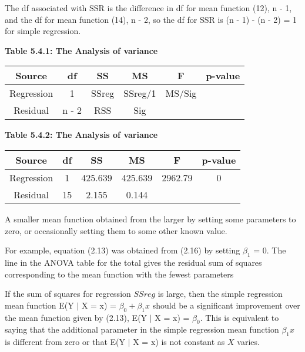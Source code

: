 \documentclass{article}
\begin{document}
    The df associated with SSR is the difference in df for mean function (12), n - 1, and the df for mean function (14), n - 2, so the df for SSR is (n - 1) - (n - 2) = 1 for simple regression. 
    
   
    \begin{center}
        \textbf{Table 5.4.1: The Analysis of variance}

        \begin{tabular}{|c|c|c|c|c|c|}
            \hline 
            Source & df & SS & MS & F & p-value \\
            \hline
            Regression & 1 & SSreg & SSreg/1 & MS/Sig & \\
            \hline
            Residual & n - 2 & RSS & Sig & & \\
            \hline
        \end{tabular}
    \end{center}
    
    \begin{center}
        \textbf{Table 5.4.2: The Analysis of variance}

        \begin{tabular}{|c|c|c|c|c|c|}
            \hline 
            Source & df & SS & MS & F & p-value \\
            \hline
            Regression & 1 & 425.639 & 425.639  & 2962.79 & 0 \\
            \hline
            Residual & 15 & 2.155 & 0.144 & & \\
            \hline
        \end{tabular}
    \end{center}
    
    A smaller mean function obtained from the larger by setting some parameters to zero, or occasionally setting them to some other known value. 
    
    For example, equation (2.13) was obtained from (2.16) by setting $\beta_{1}$ = 0. The line in the ANOVA table for the total gives the residual sum of squares corresponding to the mean function with the fewest parameters
    

    If the sum of squares for regression $SSreg$ is large, then the simple regression mean function E(Y $|$ X = x) = $\beta_{0} + \beta_{1}x$ should be a significant improvement over the mean function given by (2.13), E(Y $|$ X = x) = $\beta_{0}$. This is equivalent to saying that the additional parameter in the simple regression mean function $\beta_{1}x$ is different from zero or that E(Y $|$ X = x) is not constant as $X$ varies. 
    
\end{document}
